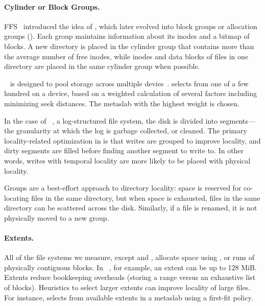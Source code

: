 \paragraph{Cylinder or Block Groups.}
FFS~\cite{DBLP:journals/tocs/McKusickJLF84} introduced the idea of ,
which later evolved into block groups or allocation groups (\xfs).
Each
group maintains information about its inodes and a bitmap of blocks. A
new directory is placed in the cylinder group that contains more than the
average number of free inodes, while inodes and data blocks of files in one
directory are placed in the same cylinder group when possible.

\zfs~\cite{DBLP:conf/lisa/Bonwick07a} is designed to pool
storage across multiple devies~\cite{DBLP:conf/lisa/Bonwick07a}.
\zfs selects from one of a few hundred  on a 
device, based on a weighted calculation of several factors
including minimizing seek distances.
The metaslab with the highest weight is chosen.

In the case of \ftwofs~\cite{DBLP:conf/fast/LeeSHC15}, a log-structured file system, 
the disk is divided into segments---the granularity at which the log is garbage collected, or cleaned.
The primary locality-related optimization in \ftwofs is that writes
are grouped to improve locality, and dirty segments are filled before
finding another segment to write to. In other words, writes with temporal
locality are more likely to be placed with physical locality.

Groups are a best-effort approach to directory locality:
space is reserved for co-locating files in the same directory,
but when space is exhausted, files in the same directory can be scattered
across the disk.  Similarly, if a file is renamed, it is not physically moved
to a new group.

\paragraph{Extents.} All of the file systems we measure, except \ftwofs and
\betrfs,
allocate space using , or runs of physically contiguous blocks.
In \ext~\cite{ext2,ext3,DBLP:journals/usenix-login/MathurCD07}, for example, an
extent can be up to 128 MiB.  Extents reduce bookkeeping overheads (storing a
range versus an exhaustive list of blocks).  Heuristics to select larger
extents can improve locality of large files.  For instance, \zfs selects from
available extents in a metaslab using a first-fit policy.

